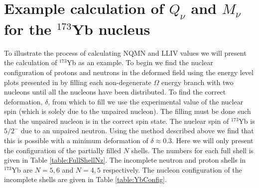 \documentclass[10pt,a4paper, twoside]{report}
\begin{document}
\section{Example calculation of $Q_{\nu}$ and $M_{\nu}$ for the $^{173}$Yb nucleus}
To illustrate the process of calculating NQMN and LLIV values we will present the calculation of $^{173}$Yb as an example. To begin we find the nuclear configuration of protons and neutrons in the deformed field using the energy level plots presented in \cite{Nilsson1955,BohrMottVol2} by filling each non-degenerate $\Omega$ energy branch with two nucleons until all the nucleons have been distributed. To find the correct deformation, $\delta$, from which to fill we use the experimental value of the nuclear spin (which is solely due to the unpaired nucleon). The filling must be done such that the unpaired nucleon is in the correct spin state. The nuclear spin of $^{173}$Yb is $5/2^{-}$ due to an unpaired neutron. Using the method described above we find that this is possible with a minimum deformation of $\delta \approx 0.3$. Here we will only present the configuration of the partially filled $N$ shells. The numbers for each full shell is given in Table \ref{table:FullShellNz}. The incomplete neutron and proton shells in $^{173}$Yb are $N = 5,6$ and $N = 4,5$ respectively. The nucleon configuration of the incomplete shells are given in Table \ref{table:YbConfig}.
\end{document}
